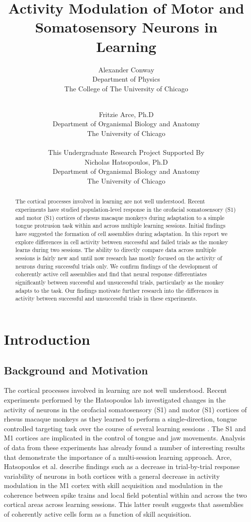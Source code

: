 \documentclass[11pt,a4paper]{article}
\title{Activity Modulation of Motor and Somatosensory Neurons in Learning}
\author{Alexander Conway \\ 
Department of Physics \\ 
The College of The University of Chicago \\ 
\and \\ 
Fritzie Arce, Ph.D \\ 
Department of Organismal Biology and Anatomy \\ 
The University of Chicago \\
\\
This Undergraduate Research Project Supported By \\ Nicholas Hatsopoulos, Ph.D \\ Department of Organismal Biology and Anatomy \\ The University of Chicago}
\begin{document}
\maketitle
\begin{abstract}
The cortical processes involved in learning are not well understood. Recent experiments have studied population-level response in the orofacial somatosensory (S1) and motor (S1) cortices of rhesus macaque monkeys during adaptation to a simple tongue protrusion task within and across multiple learning sessions. Initial findings have suggested the formation of cell assemblies during adaptation. In this report we explore differences in cell activity between successful and failed trials as the monkey learns during two sessions. The ability to directly compare data across multiple sessions is fairly new and until now research has mostly focused on the activity of neurons during successful trials only. We confirm findings of the development of coherently active cell assemblies and find that neural response differentiates significantly between successful and unsuccessful trials, particularly as the monkey adapts to the task. Our findings motivate further research into the differences in activity between successful and unsuccessful trials in these experiments.
\end{abstract}

\tableofcontents

\section{Introduction} 

\subsection{Background and Motivation}

The cortical processes involved in learning are not well understood. Recent experiments performed by the Hatsopoulos lab investigated changes in the activity of neurons in the orofacial somatosensory (S1) and motor (S1) cortices of rhesus macaque monkeys as they learned to perform a single-direction, tongue controlled targeting task over the course of several learning sessions \cite{farce-adaptation}. The S1 and M1 cortices are implicated in the control of  tongue and jaw movements. Analysis of data from these experiments has already found a number of interesting results that demonstrate the importance of a multi-session learning approach. Arce, Hatsopoulos et al. describe findings such as a decrease in trial-by-trial response variability of neurons in both cortices with a general decrease in activity modulation in the M1 cortex with skill acquisition and modulation in the coherence between spike trains and local field  potential within and across the two cortical areas across learning sessions. This latter result suggests that assemblies of coherently active cells form as a function of skill acquisition. 
\end{document}
